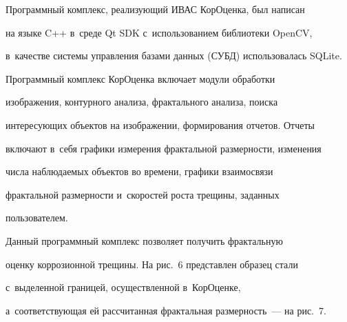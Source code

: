    Программный комплекс, реализующий ИВАС КорОценка, был написан 


на языке C++ в~среде Qt SDK с~использованием библиотеки OpenCV, 


в~качестве системы управления базами данных (СУБД) использовалась SQLite. 


   





   Программный комплекс КорОценка включает модули обработки 


изображения, контурного анализа, фрактального анализа, поиска 


интересующих объектов на изображении, формирования отчетов. Отчеты 


включают в~себя графики измерения фрактальной размерности, изменения 


числа наблюдаемых объектов во времени, графики взаимосвязи 


фрактальной размерности и~скоростей роста трещины, заданных 


пользователем.


   


   Данный программный комплекс позволяет получить фрактальную 


оценку коррозионной трещины. На рис.~6 представлен образец стали 


с~выделенной границей, осуществленной в~КорОценке, 


а~соответствующая ей рассчитанная фрактальная размерность~--- на рис.~7.


   


